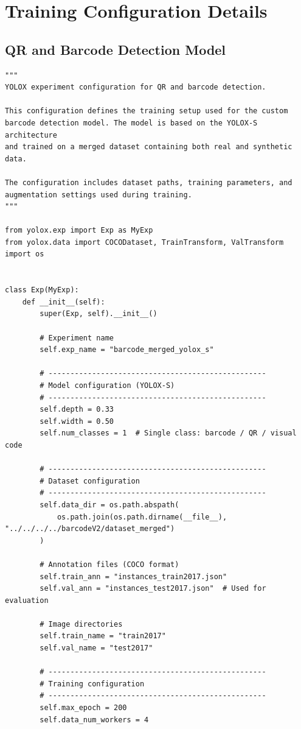 \chapter{Training Configuration Details}
\label{app:yolox_config}

\section{QR and Barcode Detection Model}

\begin{lstlisting}[caption={YOLOX experiment file for QR and barcode detection}, label={lst:yolox_barcode}]
"""
YOLOX experiment configuration for QR and barcode detection.

This configuration defines the training setup used for the custom
barcode detection model. The model is based on the YOLOX-S architecture
and trained on a merged dataset containing both real and synthetic data.

The configuration includes dataset paths, training parameters, and
augmentation settings used during training.
"""

from yolox.exp import Exp as MyExp
from yolox.data import COCODataset, TrainTransform, ValTransform
import os


class Exp(MyExp):
    def __init__(self):
        super(Exp, self).__init__()

        # Experiment name
        self.exp_name = "barcode_merged_yolox_s"

        # --------------------------------------------------
        # Model configuration (YOLOX-S)
        # --------------------------------------------------
        self.depth = 0.33
        self.width = 0.50
        self.num_classes = 1  # Single class: barcode / QR / visual code

        # --------------------------------------------------
        # Dataset configuration
        # --------------------------------------------------
        self.data_dir = os.path.abspath(
            os.path.join(os.path.dirname(__file__), "../../../../barcodeV2/dataset_merged")
        )

        # Annotation files (COCO format)
        self.train_ann = "instances_train2017.json"
        self.val_ann = "instances_test2017.json"  # Used for evaluation

        # Image directories
        self.train_name = "train2017"
        self.val_name = "test2017"

        # --------------------------------------------------
        # Training configuration
        # --------------------------------------------------
        self.max_epoch = 200
        self.data_num_workers = 4


\end{lstlisting}
